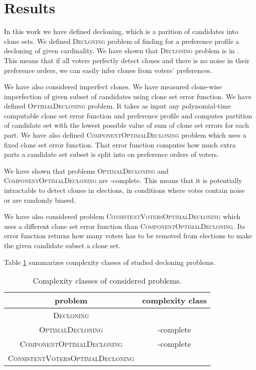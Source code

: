 \section{Results}

In this work we have defined decloning, which is a parition of candidates into clone sets.
We defined \textsc{Decloning} problem of finding for a preference profile a decloning of given cardinality.
We have shown that \textsc{Decloning} problem is in \p.
This means that if all voters perfectly detect clones
and there is no noise in their preference orders,
we can easily infer clones from voters' preferences.

We have also considered imperfect clones.
We have measured clone-wise imperfection of given subset of candidates using clone set error function.
We have defined \textsc{OptimalDecloning} problem.
It takes as input any polynomial-time computable clone set error function and preference profile
and computes partition of candidate set with the lowest possible value of sum of clone set errors for each part.
We have also defined \textsc{ComponentOptimalDecloning} problem which uses a fixed clone set error function.
That error function computes how much extra parts a candidate set subset is split into
on preference orders of voters.

We have shown that problems \textsc{OptimalDecloning} and \textsc{ComponentOptimalDecloning}
are \np-complete.
This means that it is potentially intractable to detect clones in elections,
in conditions where votes contain noise or are randomly biased.

We have also considered problem \textsc{ConsistentVotersOptimalDecloning}
which uses a different clone set error function than \textsc{ComponentOptimalDecloning}.
Its error function returns how many voters has to be removed from elections
to make the given candidate subset a clone set.

Table \ref{cclasses} summarizes complexity classes of studied decloning problems.

\begin{table}
\centering
\begin{tabular}{| c | c |}\hline
	\textbf{problem} & \textbf{complexity class} \\ \hline
	\textsc{Decloning} & \p \\ \hline
	\textsc{OptimalDecloning} & \np-complete \\ \hline
	\textsc{ComponentOptimalDecloning} & \np-complete \\ \hline
	\textsc{ConsistentVotersOptimalDecloning} & \np \\ \hline
\end{tabular}
\caption{Complexity classes of considered problems.} \label{cclasses}
\end{table}


